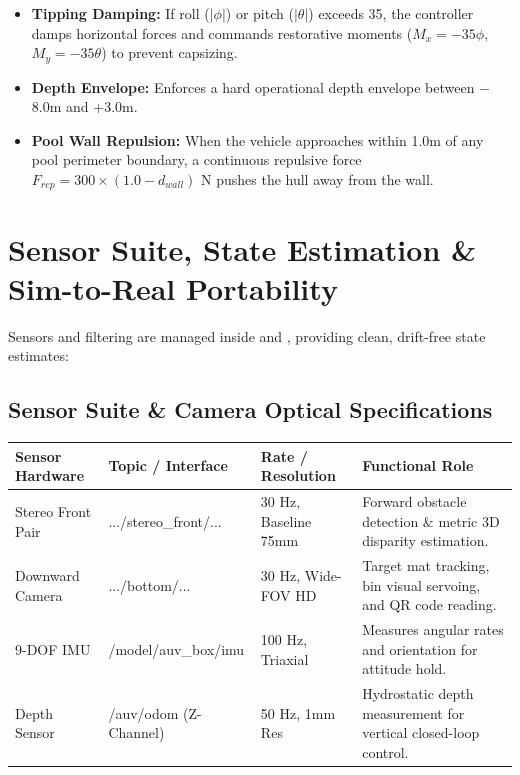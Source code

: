 \documentclass[10.5pt,a4paper]{article}
\newcommand{\hl}[1]{\tikz[baseline=(t.base)]{\node[fill=codeorange,rounded corners=2pt,inner sep=2pt,font=\ttfamily\scriptsize,text=codeorangetxt] (t) {#1};}}
\begin{document}
\begin{itemize}[leftmargin=1.3em,itemsep=2pt]
  \item \textbf{Tipping Damping:} If roll ($|\phi|$) or pitch ($|\theta|$) exceeds
    35\textdegree, the controller damps horizontal forces and commands restorative moments
    ($M_x = -35\phi$, $M_y = -35\theta$) to prevent capsizing.
  \item \textbf{Depth Envelope:} Enforces a hard operational depth envelope between
    $-$8.0m and +3.0m.
  \item \textbf{Pool Wall Repulsion:} When the vehicle approaches within 1.0m of any pool
    perimeter boundary, a continuous repulsive force $F_{rep} = 300\times(1.0-d_{wall})$ N
    pushes the hull away from the wall.
\end{itemize}

\section{Sensor Suite, State Estimation \& Sim-to-Real Portability}

Sensors and filtering are managed inside \hl{auv\_sensors} and \hl{auv\_bringup}, providing
clean, drift-free state estimates:

\subsection{Sensor Suite \& Camera Optical Specifications}

\begin{table}[H]\centering\small
\begin{tabularx}{\textwidth}{L{2.8cm} L{4.0cm} L{2.6cm} X}
\toprule
{}\textbf{Sensor Hardware} & \textbf{Topic / Interface} & \textbf{Rate / Resolution} & \textbf{Functional Role} \\
\midrule
Stereo Front Pair & \scriptsize\ttfamily .../stereo\_front/... & 30 Hz, Baseline 75mm & Forward obstacle detection \& metric 3D disparity estimation. \\
Downward Camera & \scriptsize\ttfamily .../bottom/... & 30 Hz, Wide-FOV HD & Target mat tracking, bin visual servoing, and QR code reading. \\
9-DOF IMU & \scriptsize\ttfamily /model/auv\_box/imu & 100 Hz, Triaxial & Measures angular rates and orientation for attitude hold. \\
Depth Sensor & \scriptsize\ttfamily /auv/odom (Z-Channel) & 50 Hz, 1mm Res & Hydrostatic depth measurement for vertical closed-loop control. \\
\bottomrule
\end{tabularx}
\end{table}
\end{document}
